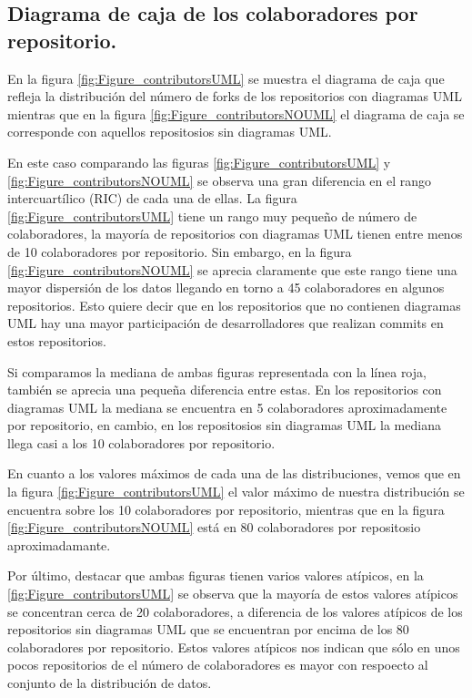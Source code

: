 \documentclass[a4paper, 12pt]{book}
\begin{document}
\subsection{Diagrama de caja de los colaboradores por repositorio.}
\label{sec:Diagrama de caja de los colaboradores por repositorio}
En la figura \ref{fig:Figure_contributorsUML} se muestra el diagrama de caja que refleja la distribución del número de forks de los repositorios con diagramas UML mientras que en la figura \ref{fig:Figure_contributorsNOUML} el diagrama de caja se corresponde con aquellos repositosios sin diagramas UML.


En este caso comparando las figuras \ref{fig:Figure_contributorsUML} y \ref{fig:Figure_contributorsNOUML} se observa una gran diferencia en el rango intercuartílico (RIC) de cada una de ellas.
La figura \ref{fig:Figure_contributorsUML} tiene un rango muy pequeño de número de colaboradores, la mayoría de repositorios con diagramas UML tienen entre menos de 10 colaboradores por repositorio.
Sin embargo, en la figura \ref{fig:Figure_contributorsNOUML} se aprecia claramente que este rango tiene una mayor dispersión de los datos llegando en torno a 45 colaboradores en algunos repositorios. 
Esto quiere decir que en los repositorios que no contienen diagramas UML hay una mayor participación de desarrolladores que realizan commits en estos repositorios.


Si comparamos la mediana de ambas figuras representada con la línea roja, también se aprecia una pequeña diferencia entre estas. 
En los repositorios con diagramas UML la mediana se encuentra en 5 colaboradores aproximadamente por repositorio, en cambio, en los repositosios sin diagramas UML la mediana llega casi a los 10 colaboradores por repositorio.


En cuanto a los valores máximos de cada una de las distribuciones, vemos que en la figura \ref{fig:Figure_contributorsUML} el valor máximo de nuestra distribución se encuentra sobre los 10 colaboradores por repositorio, mientras que en la figura \ref{fig:Figure_contributorsNOUML} está en 80 colaboradores por repositosio aproximadamante.


Por último, destacar que ambas figuras tienen varios valores atípicos, en la \ref{fig:Figure_contributorsUML} se observa que la mayoría de estos valores atípicos se concentran cerca de 20 colaboradores, a diferencia de los valores atípicos de los repositorios sin diagramas UML que se encuentran por encima de los 80 colaboradores por repositorio. 
Estos valores atípicos nos indican que sólo en unos pocos repositorios de el número de colaboradores es mayor con respoecto al conjunto de la distribución de datos.
\end{document}
